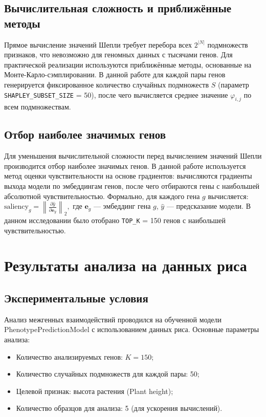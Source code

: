 \subsection{Вычислительная сложность и приближённые методы}

Прямое вычисление значений Шепли требует перебора всех $2^{|N|}$ 
подмножеств признаков, что невозможно для геномных данных с тысячами 
генов. Для практической реализации используются приближённые методы, 
основанные на Монте-Карло-сэмплировании. В данной работе для каждой 
пары генов генерируется фиксированное количество случайных подмножеств 
$S$ (параметр \texttt{SHAPLEY\_SUBSET\_SIZE} = 50), после чего вычисляется 
среднее значение $\varphi_{i,j}$ по всем подмножествам.

\subsection{Отбор наиболее значимых генов}

Для уменьшения вычислительной сложности перед вычислением значений 
Шепли производится отбор наиболее значимых генов. В данной работе 
используется метод оценки чувствительности на основе градиентов: 
вычисляются градиенты выхода модели по эмбеддингам генов, после чего 
отбираются гены с наибольшей абсолютной чувствительностью. Формально, 
для каждого гена $g$ вычисляется:
$
\text{saliency}_g = \left\|\frac{\partial \hat{y}}{\partial \mathbf{e}_g}\right\|_2,
$
где $\mathbf{e}_g$ — эмбеддинг гена $g$, $\hat{y}$ — предсказание модели. 
В данном исследовании было отобрано \texttt{TOP\_K} = 150 генов с 
наибольшей чувствительностью.

\section{Результаты анализа на данных риса}

\subsection{Экспериментальные условия}

Анализ межгенных взаимодействий проводился на обученной модели 
PhenotypePredictionModel с использованием данных риса. Основные 
параметры анализа:
\begin{itemize}
	\item Количество анализируемых генов: $K = 150$;
	\item Количество случайных подмножеств для каждой пары: 50;
	\item Целевой признак: высота растения (Plant height);
	\item Количество образцов для анализа: 5 (для ускорения вычислений).
\end{itemize}

